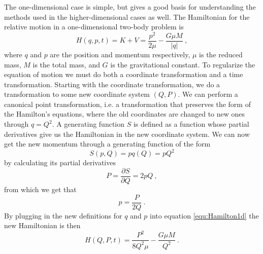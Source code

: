 \documentclass[english, oneside]{HYgradu}
\begin{document}
The one-dimensional case is simple, but gives a good basis for understanding the methods used in the higher-dimensional cases as well. The Hamiltonian for the relative motion in a one-dimensional two-body problem is
\begin{equation} \label{equ:Hamilton1d}
H(q,p,t) = K + V = \frac{p^2}{2 \mu} - \frac{G \mu M}{\left| q \right|} \ ,
\end{equation}
where $q$ and $p$ are the position and momentum respectively, $\mu$ is the reduced mass, $M$ is the total mass, and $G$ is the gravitational constant. 
To regularize the equation of motion we must do both a coordinate transformation and a time transformation. Starting with the coordinate transformation, we do a transformation to some new coordinate system $(Q, P)$. We can perform a canonical point transformation, i.e. a transformation that preserves the form of the Hamilton's equations, where the old coordinates are changed to new ones through $q = Q^2$. A generating function $S$ is defined as a function whose partial derivatives give us the Hamiltonian in the new coordinate system. We can now get the new momentum through a generating function of the form
\begin{equation}
S(p,Q) = pq(Q) = pQ^2
\end{equation}
by calculating its partial derivatives
\begin{equation}
P = \frac{\partial S}{\partial Q} = 2pQ \ ,
\end{equation}
from which we get that
\begin{equation}
p = \frac{P}{2Q} \ .
\end{equation}
By plugging in the new definitions for $q$ and $p$ into equation \eqref{equ:Hamilton1d} the new Hamiltonian is then
\begin{equation}
H(Q,P,t) = \frac{P^2}{8Q^2 \mu} - \frac{G \mu M}{Q^2} \ .
\end{equation}
\end{document}
